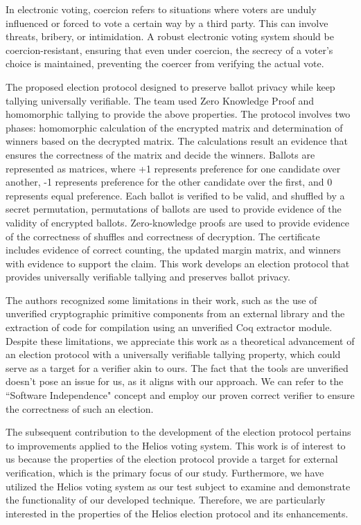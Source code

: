 In electronic voting, coercion refers to situations where voters are unduly influenced or forced to vote a certain way by a third party. This can involve threats, bribery, or intimidation. A robust electronic voting system should be coercion-resistant, ensuring that even under coercion, the secrecy of a voter's choice is maintained, preventing the coercer from verifying the actual vote.

The proposed election protocol designed to preserve ballot privacy while keep tallying universally verifiable. The team used Zero Knowledge Proof and homomorphic tallying to provide the above properties. The protocol involves two phases: homomorphic calculation of the encrypted matrix and determination of winners based on the decrypted matrix. The calculations result an evidence that ensures the correctness of the matrix and decide the winners. Ballots are represented as matrices, where +1 represents preference for one candidate over another, -1 represents preference for the other candidate over the first, and 0 represents equal preference. Each ballot is verified to be valid, and shuffled by a secret permutation, permutations of ballots are used to provide evidence of the validity of encrypted ballots. Zero-knowledge proofs are used to provide evidence of the correctness of shuffles and correctness of decryption. The certificate includes evidence of correct counting, the updated margin matrix, and winners with evidence to support the claim. This work develops an election protocol that provides universally verifiable tallying and preserves ballot privacy. 

The authors recognized some limitations in their work, such as the use of unverified cryptographic primitive components from an external library and the extraction of code for compilation using an unverified Coq extractor module. Despite these limitations, we appreciate this work as a theoretical advancement of an election protocol with a universally verifiable tallying property, which could serve as a target for a verifier akin to ours. The fact that the tools are unverified doesn't pose an issue for us, as it aligns with our approach. We can refer to the ``Software Independence" concept \cite{Rivest2008OnTN} and employ our proven correct verifier to ensure the correctness of such an election.

The subsequent contribution to the development of the election protocol pertains to improvements applied to the Helios voting system. This work is of interest to us because the properties of the election protocol provide a target for external verification, which is the primary focus of our study. Furthermore, we have utilized the Helios voting system \cite{Adida2008HeliosWO} as our test subject to examine and demonstrate the functionality of our developed technique. Therefore, we are particularly interested in the properties of the Helios election protocol and its enhancements.


